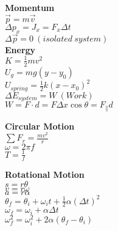 \documentclass[12pt]{article}
\begin{document}
\begin{twocolumn}
\begin{flushleft}
\bigskip
{\bf Momentum }\\
\medskip
$\displaystyle \vec{p} = m \vec{v}$ \\
\medskip
$\displaystyle \Delta p_{x} = J_x = F_x \Delta t$ \\
\medskip
$\displaystyle \Delta \vec{p} = 0 \ (isolated~system)$ \\


\bigskip
{\bf Energy}\\
\medskip
$\displaystyle {K} = \frac{1}{2} m v^2$ \\
\medskip
$\displaystyle U_{g} = m g (y - y_0)$ \\
\medskip
$\displaystyle U_{spring} = \frac{1}{2} k (x-x_0)^2$\\
\medskip
$\displaystyle \Delta E_{system}  = W \ (Work)$ \\

\medskip
$\displaystyle W = F \cdot d = F\Delta x \cos \theta = F_\parallel d$\\

\medskip
\medskip



{\bf Circular Motion} \\
\medskip
$\displaystyle \sum F_{r} = \frac{m v^2}{r} $\\
\medskip
$\displaystyle \omega = 2 \pi f $ \\
\medskip
$\displaystyle T = \frac{1}{f} $ \\
\medskip


{\bf Rotational Motion} \\
\medskip
$\displaystyle s = r \theta$ \\
\medskip
$\displaystyle v = r \omega$ \\
\medskip
$\displaystyle a = r \alpha $\\
\medskip
$\displaystyle \theta_f = \theta_i + \omega_{i} t + \frac{1}{2} \alpha (\Delta t)^2$ \\
\medskip
$\displaystyle \omega_{f} = \omega_{i} + \alpha \Delta t $ \\
\medskip
$\displaystyle \omega_{f}^2 = \omega_{i}^2 + 2 \alpha (\theta_f - \theta_i)$\\


\end{flushleft}
\end{twocolumn}
\end{document}
